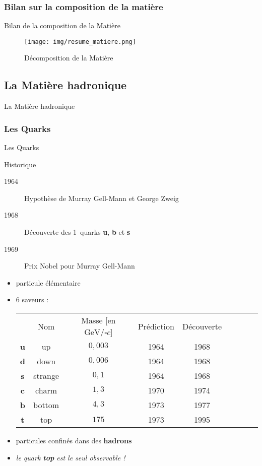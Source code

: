 \documentclass[handout,8pt]{beamer} %
\begin{document}
\subsubsection{Bilan sur la composition de la matière}
\begin{frame}{Bilan de la composition de la Matière}

	\begin{figure}
		\texttt{[image: img/resume\_matiere.png]} 
		\caption{Décomposition de la Matière}
	\end{figure}

\end{frame}

\subsection{La Matière hadronique}
\begin{frame}{La Matière hadronique}

\end{frame}

\subsubsection{Les Quarks}
\begin{frame}{Les Quarks}
	\begin{block}{Historique}
		\begin{description}
			\item[1964] Hypothèse de Murray Gell-Mann et George Zweig
			\item[1968] Découverte des 1\iers\ quarks \textbf{u}, \textbf{b} et \textbf{s}
			\item[1969] Prix Nobel pour Murray Gell-Mann
		\end{description}
	\end{block}

	\begin{itemize}
		\item particule élémentaire
		\item 6 saveurs :
		\begin{tabular}{ c c c c c c c c c }
			& Nom & Masse [en $\si{\GeV\per\square c}$] & Prédiction & Découverte \\
			\textbf{u} & up & $0,003$ & 1964 & 1968 \\
			\textbf{d} & down & $0,006$ & 1964 & 1968 \\
			\textbf{s} & strange & $0,1$ & 1964 & 1968 \\
			\textbf{c} & charm & $1,3$ & 1970 & 1974 \\
			\textbf{b} & bottom & $4,3$ & 1973 & 1977 \\
			\textbf{t} & top & $175$ & 1973 & 1995 \\
		\end{tabular}
		\item particules confinés dans des \textbf{hadrons}
		\item \textit{le quark \textbf{top} est le seul observable !}
	\end{itemize}
\end{frame}
\end{document}
